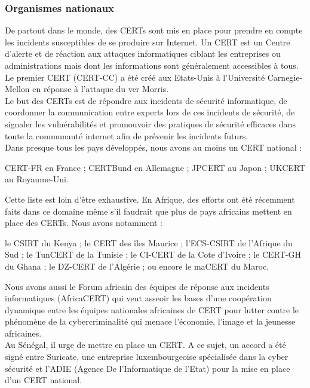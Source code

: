 \subsubsection{Organismes nationaux}
De partout dans le monde, des CERTs sont mis en place pour prendre en compte les incidents susceptibles de se produire sur Internet. Un CERT est un Centre d’alerte et de réaction aux attaques informatiques ciblant les entreprises ou administrations mais dont les informations sont généralement accessibles à tous. Le premier CERT (CERT-CC) a été créé aux Etats-Unis à l’Université Carnegie-Mellon en réponse à l’attaque du ver Morris. \\
Le but des CERTs est de répondre aux incidents de sécurité informatique, de coordonner la communication entre experts lors de ces incidents de sécurité, de signaler les vulnérabilités et promouvoir des pratiques de sécurité efficaces dans toute la communauté internet afin de prévenir les incidents futurs. \\
Dans presque tous les pays développés, nous avons au moins un CERT national :
\begin{itemize}
	\itemtirait CERT-FR en France ;
	\itemtirait CERTBund en Allemagne ; 
	\itemtirait JPCERT au Japon ;
	\itemtirait UKCERT au Royaume-Uni.
\end{itemize}
Cette liste est loin d'être exhaustive.
En Afrique, des efforts ont été récemment faits  dans ce domaine même s’il faudrait que plus de pays africains mettent en place des CERTs. Nous avons notamment :
\begin{itemize}
	\itemtirait le CSIRT du Kenya ;
	\itemtirait le CERT des îles Maurice ;
	\itemtirait l’ECS-CSIRT de l’Afrique du Sud ;
	\itemtirait le TunCERT de la Tunisie ;
	\itemtirait le CI-CERT de la Cote d’Ivoire ;
	\itemtirait le CERT-GH du Ghana ;
	\itemtirait le DZ-CERT de l’Algérie ;
	\itemtirait ou encore le maCERT du Maroc.
\end{itemize}
Nous avons aussi le Forum africain des équipes de réponse aux incidents informatiques (AfricaCERT) qui veut asseoir les bases d’une coopération dynamique entre les équipes nationales africaines de CERT pour lutter contre le phénomène de la cybercriminalité qui menace l’économie, l’image et la jeunesse africaines.\\
Au Sénégal, il urge de mettre en place un CERT. A ce sujet, un accord a été signé entre Suricate, une entreprise luxembourgeoise spécialisée dans la cyber sécurité et l'ADIE (Agence De l'Informatique de l'Etat) pour la mise en place d'un CERT national. \\
